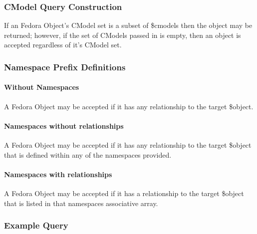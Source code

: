 \subsubsection*{C\+Model Query Construction}

If an Fedora Object's C\+Model set is a subset of \$cmodels then the object may be returned; however, if the set of C\+Models passed in is empty, then an object is accepted regardless of it's C\+Model set.

\subsubsection*{Namespace Prefix Definitions}

\paragraph*{Without Namespaces}

A Fedora Object may be accepted if it has any relationship to the target \$object.

\paragraph*{Namespaces without relationships}

A Fedora Object may be accepted if it has any relationship to the target \$object that is defined within any of the namespaces provided.

\paragraph*{Namespaces with relationships}

A Fedora Object may be accepted if it has a relationship to the target \$object that is listed in that namespaces associative array.

\subsubsection*{Example Query}

